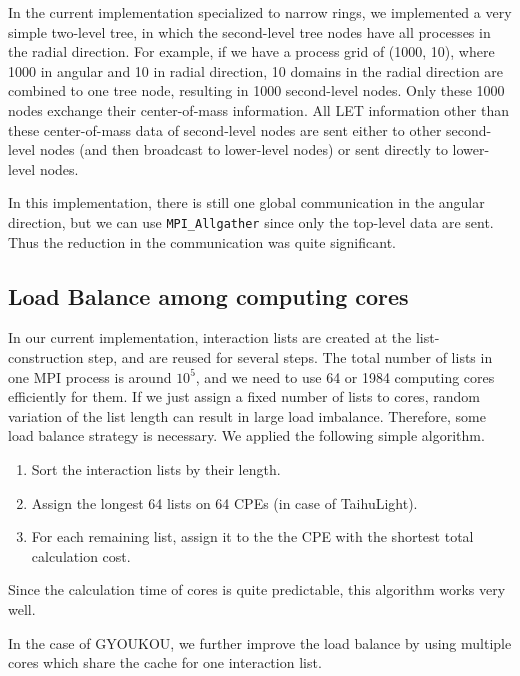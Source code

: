 \documentclass[conference]{IEEEtran}
\begin{document}
In the current implementation specialized to narrow rings, we
implemented a very simple two-level tree, in which the second-level
tree nodes have all processes in the radial direction. For example, if we
have a process grid of (1000, 10), where 1000 in angular and 10 in
radial direction, 10 domains in the radial direction are combined to
one tree node, resulting in 1000 second-level nodes. Only these 1000
nodes exchange their center-of-mass information. All LET information
other than these center-of-mass data of second-level nodes are sent
either to other second-level nodes (and then broadcast to
lower-level nodes) or sent directly to lower-level nodes.

In this implementation, there is still one global communication in the
angular direction, but we can use {\tt MPI\_Allgather} since only the
top-level data are sent. Thus the reduction in the communication was
quite significant.


\subsection{Load Balance among computing cores}
\label{subsec:force}

In our current implementation, interaction lists are created at the
list-construction step, and are reused for several steps. The total
number of lists in one MPI process is around $10^5$, and we need to
use 64 or 1984 computing cores efficiently for them.
If we just assign a fixed number of lists to cores, random variation
of the list length can result in large load imbalance. Therefore, some
load balance strategy is necessary. We applied the following simple algorithm.

\begin{enumerate}
  
\item Sort the interaction lists by their length.

\item Assign the longest 64 lists on 64 CPEs (in case of TaihuLight).

\item For each remaining list, assign it to the the CPE with the
  shortest total calculation cost.
  
\end{enumerate}

Since the calculation time of cores is quite predictable, this
algorithm works very well.

In the case of GYOUKOU, we further improve the load balance by using
multiple cores which share the cache for 
one interaction list.
\end{document}
